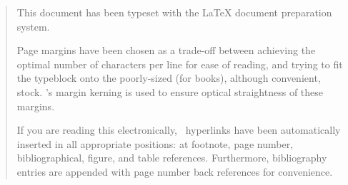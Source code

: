 \vfill
\begin{quotation}
  \noindent This document has been typeset with the \LaTeX{} document
  preparation system.

  Page margins have been chosen as a trade-off between achieving the
  optimal number of characters per line for ease of reading, and trying 
  to fit the typeblock onto the poorly-sized (for books), although 
  convenient,  stock.
  \pdftex's margin kerning is used to ensure optical straightness of these 
  margins.

  If you are reading this electronically, \PDF\ hyperlinks have
  been automatically inserted in all appropriate positions: at
  footnote, page number, bibliographical, figure, and table
  references. Furthermore, bibliography entries are appended with page
  number back references for convenience.
\end{quotation}
\vfill